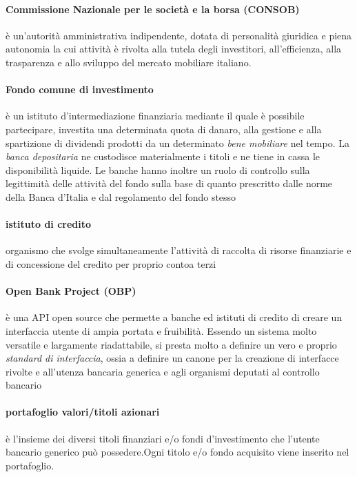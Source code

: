 \paragraph{Commissione Nazionale per le società e la borsa (CONSOB)}
	è un'autorità amministrativa indipendente, dotata di personalità giuridica e piena autonomia la cui attività è rivolta alla tutela degli investitori, all'efficienza, alla trasparenza e allo sviluppo del mercato mobiliare italiano. %
	
	 
\paragraph{Fondo comune di investimento}
	è un istituto d'intermediazione finanziaria mediante il quale è possibile partecipare, investita una determinata quota di danaro, alla gestione e alla spartizione di dividendi prodotti da un determinato \emph{bene mobiliare} nel tempo. La \emph{banca depositaria} ne custodisce materialmente i titoli e ne tiene in cassa le disponibilità liquide. Le banche hanno inoltre un ruolo di controllo sulla legittimità delle attività del fondo sulla base di quanto prescritto dalle norme della Banca d'Italia e dal regolamento del fondo stesso
	
\paragraph{istituto di credito}
	organismo che svolge simultaneamente l’attività di raccolta di risorse finanziarie e di concessione del credito per proprio contoa terzi 
\paragraph{Open Bank Project (OBP)}
	è una API open source che permette a banche ed istituti di credito di creare un interfaccia utente di ampia portata e fruibilità. Essendo un sistema molto versatile e largamente riadattabile, si presta molto a definire un vero e proprio \emph{standard di interfaccia}, ossia a definire un canone per la creazione di interfacce rivolte e all'utenza bancaria generica e agli organismi deputati al controllo bancario
\paragraph{portafoglio valori/titoli azionari}
	è l'insieme dei diversi titoli finanziari e/o fondi d'investimento che l'utente bancario generico può possedere.Ogni titolo e/o fondo acquisito viene inserito nel portafoglio.
